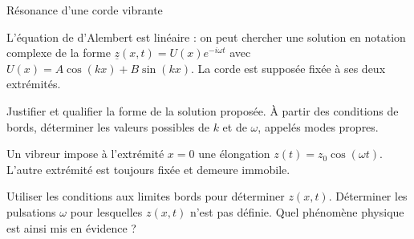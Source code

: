 \begin{exo}[PSI][2][TD]{Résonance d'une corde vibrante}
\begin{quest}
\end{quest}

\newcommand{\z}{\underline{z}}
L’équation de d’Alembert est linéaire : on peut chercher une solution en notation complexe de la forme  $\z(x,t) = U(x) e^{-i\omega t}$ avec $U(x) = A \cos(kx) + B \sin(kx)$.
La corde est supposée fixée à ses deux extrémités.

\begin{quest}

\item Justifier et qualifier la forme de la solution proposée. À partir des conditions de bords, déterminer les valeurs possibles de $k$ et de $\omega$, appelés modes propres.

\end{quest}
\newcommand{\zm}{z_{\rm max}}
Un vibreur impose à l'extrémité $x=0$ une élongation $z(t) = z_0 \cos(\omega t)$. L'autre extrémité est toujours fixée et demeure immobile.

\begin{quest}

\item Utiliser les conditions aux limites bords pour déterminer $z(x,t)$.
 Déterminer les pulsations $\omega$ pour lesquelles $z(x,t)$ n'est pas définie. Quel phénomène physique est ainsi mis en évidence ?


\end{quest}
\end{exo}

